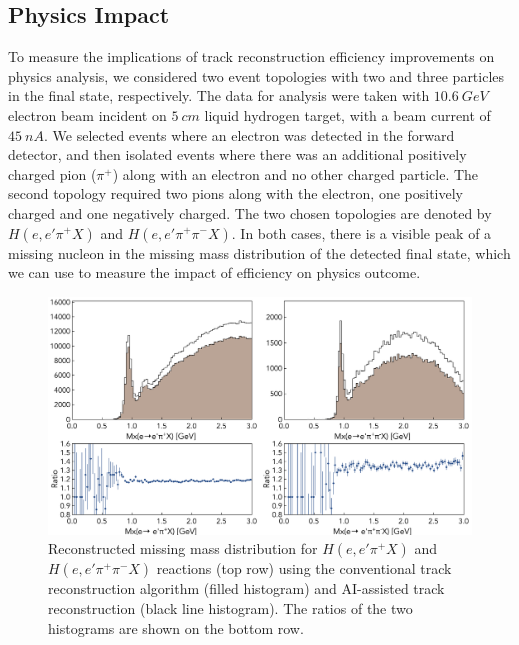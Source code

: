 \documentclass[aps,prl,preprint,12pt]{revtex4}
\begin{document}
\subsection{Physics Impact}

To measure the implications of track reconstruction efficiency improvements on physics analysis, 
we considered two event topologies with two and three particles in the final state, respectively. 
The data for analysis were taken with $10.6~GeV$ electron beam incident on $5~cm$ liquid 
hydrogen target, with a beam current of $45~nA$. 
We selected events where an electron was detected in the forward detector, and then isolated 
events where there was an additional positively charged pion ($\pi^+$) along with an electron 
and no other charged particle. The second topology required two pions along with the electron, 
one positively charged and one negatively charged. The two chosen topologies are denoted by 
$H(e,e'\pi^+X)$ and $H(e,e'\pi^+\pi^-X)$. In both cases, there is a visible peak of a missing nucleon
in the missing mass distribution of the detected final state, which we can use to measure the impact 
of efficiency on physics outcome. 

 \begin{figure}[!ht]
\begin{center}
 \includegraphics[width=6.0in]{images/physics_scan.pdf}
\caption {Reconstructed missing mass distribution for $H(e,e'\pi^+X)$ and $H(e,e'\pi^+\pi^-X)$ 
reactions (top row) using the conventional track reconstruction algorithm (filled histogram) and  
AI-assisted track reconstruction (black line histogram). The ratios of the two histograms are shown 
on the bottom row. }
 \label{physics:outcome}
 \end{center}
\end{figure}
\end{document}
